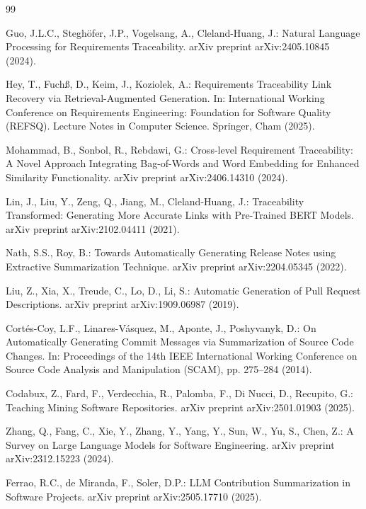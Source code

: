 \documentclass[runningheads]{llncs}
\begin{document}
\begin{thebibliography}{99}

Guo, J.L.C., Steghöfer, J.P., Vogelsang, A., Cleland-Huang, J.: Natural Language 
Processing for Requirements Traceability. arXiv preprint arXiv:2405.10845 (2024).

Hey, T., Fuchß, D., Keim, J., Koziolek, A.: Requirements Traceability Link 
Recovery via Retrieval-Augmented Generation. In: International Working 
Conference on Requirements Engineering: Foundation for Software Quality (REFSQ). 
Lecture Notes in Computer Science. Springer, Cham (2025).

Mohammad, B., Sonbol, R., Rebdawi, G.: Cross-level Requirement Traceability: 
A Novel Approach Integrating Bag-of-Words and Word Embedding for Enhanced 
Similarity Functionality. arXiv preprint arXiv:2406.14310 (2024).

Lin, J., Liu, Y., Zeng, Q., Jiang, M., Cleland-Huang, J.: Traceability 
Transformed: Generating More Accurate Links with Pre-Trained BERT Models. 
arXiv preprint arXiv:2102.04411 (2021).

Nath, S.S., Roy, B.: Towards Automatically Generating Release Notes using 
Extractive Summarization Technique. arXiv preprint arXiv:2204.05345 (2022).

Liu, Z., Xia, X., Treude, C., Lo, D., Li, S.: Automatic Generation of Pull 
Request Descriptions. arXiv preprint arXiv:1909.06987 (2019).

Cortés-Coy, L.F., Linares-Vásquez, M., Aponte, J., Poshyvanyk, D.: On
Automatically Generating Commit Messages via Summarization of Source Code Changes.
In: Proceedings of the 14th IEEE International Working Conference on Source Code
Analysis and Manipulation (SCAM), pp. 275--284 (2014).

Codabux, Z., Fard, F., Verdecchia, R., Palomba, F., Di Nucci, D., Recupito, G.: 
Teaching Mining Software Repositories. arXiv preprint arXiv:2501.01903 (2025).

Zhang, Q., Fang, C., Xie, Y., Zhang, Y., Yang, Y., Sun, W., Yu, S., Chen, Z.: 
A Survey on Large Language Models for Software Engineering. arXiv preprint 
arXiv:2312.15223 (2024).

Ferrao, R.C., de Miranda, F., Soler, D.P.: LLM Contribution Summarization 
in Software Projects. arXiv preprint arXiv:2505.17710 (2025).

\end{thebibliography}
\end{document}
